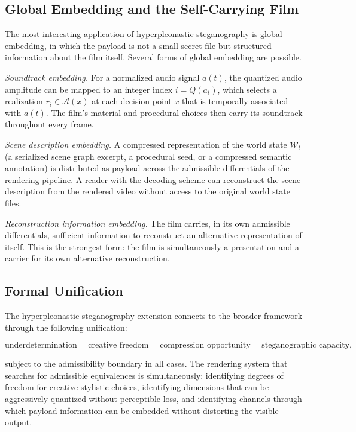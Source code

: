 \documentclass[12pt,a4paper]{article}
\theoremstyle{plain}
\theoremstyle{definition}
\theoremstyle{remark}
\begin{document}
\subsection{Global Embedding and the Self-Carrying Film}

The most interesting application of hyperpleonastic steganography is global embedding, in which the payload is not a small secret file but structured information about the film itself. Several forms of global embedding are possible.

\textit{Soundtrack embedding.} For a normalized audio signal $a(t)$, the quantized audio amplitude can be mapped to an integer index $i = Q(a_t)$, which selects a realization $r_i \in \mathcal{A}(x)$ at each decision point $x$ that is temporally associated with $a(t)$. The film's material and procedural choices then carry its soundtrack throughout every frame.

\textit{Scene description embedding.} A compressed representation of the world state $\mathcal{W}_t$ (a serialized scene graph excerpt, a procedural seed, or a compressed semantic annotation) is distributed as payload across the admissible differentials of the rendering pipeline. A reader with the decoding scheme can reconstruct the scene description from the rendered video without access to the original world state files.

\textit{Reconstruction information embedding.} The film carries, in its own admissible differentials, sufficient information to reconstruct an alternative representation of itself. This is the strongest form: the film is simultaneously a presentation and a carrier for its own alternative reconstruction.

\subsection{Formal Unification}

The hyperpleonastic steganography extension connects to the broader framework through the following unification:

\[
\text{underdetermination} = \text{creative freedom} = \text{compression opportunity} = \text{steganographic capacity},
\]

subject to the admissibility boundary in all cases. The rendering system that searches for admissible equivalences is simultaneously: identifying degrees of freedom for creative stylistic choices, identifying dimensions that can be aggressively quantized without perceptible loss, and identifying channels through which payload information can be embedded without distorting the visible output.
\end{document}
